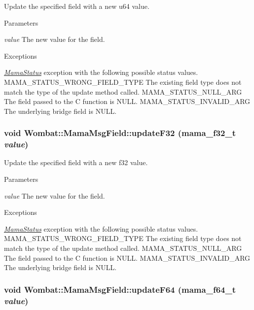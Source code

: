 Update the specified field with a new u64 value. 
\begin{DoxyParams}{Parameters}
\item[{\em value}]The new value for the field.\end{DoxyParams}

\begin{DoxyExceptions}{Exceptions}
\item[{\em \hyperlink{classWombat_1_1MamaStatus}{MamaStatus}}]exception with the following possible status values. MAMA\_\-STATUS\_\-WRONG\_\-FIELD\_\-TYPE The existing field type does not match the type of the update method called. MAMA\_\-STATUS\_\-NULL\_\-ARG The field passed to the C function is NULL. MAMA\_\-STATUS\_\-INVALID\_\-ARG The underlying bridge field is NULL. \end{DoxyExceptions}
\hypertarget{classWombat_1_1MamaMsgField_af3e4b526af6634d029b7a6337956a2b2}{
\subsubsection[{updateF32}]{\setlength{\rightskip}{0pt plus 5cm}void Wombat::MamaMsgField::updateF32 (mama\_\-f32\_\-t {\em value})}}
\label{classWombat_1_1MamaMsgField_af3e4b526af6634d029b7a6337956a2b2}


Update the specified field with a new f32 value. 
\begin{DoxyParams}{Parameters}
\item[{\em value}]The new value for the field.\end{DoxyParams}

\begin{DoxyExceptions}{Exceptions}
\item[{\em \hyperlink{classWombat_1_1MamaStatus}{MamaStatus}}]exception with the following possible status values. MAMA\_\-STATUS\_\-WRONG\_\-FIELD\_\-TYPE The existing field type does not match the type of the update method called. MAMA\_\-STATUS\_\-NULL\_\-ARG The field passed to the C function is NULL. MAMA\_\-STATUS\_\-INVALID\_\-ARG The underlying bridge field is NULL. \end{DoxyExceptions}
\hypertarget{classWombat_1_1MamaMsgField_a87305cc1f060d2bf60dd546857bcef74}{
\subsubsection[{updateF64}]{\setlength{\rightskip}{0pt plus 5cm}void Wombat::MamaMsgField::updateF64 (mama\_\-f64\_\-t {\em value})}}
\label{classWombat_1_1MamaMsgField_a87305cc1f060d2bf60dd546857bcef74}


